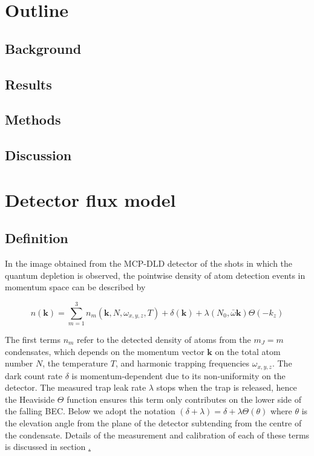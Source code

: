 \documentclass[%
 reprint,
 amsmath,amssymb,
 aps,
]{revtex4-1}
\begin{document}
\section{Outline}

\subsection{Background}

\subsection{Results}

\subsection{Methods}

\subsection{Discussion}


\section{\label{introduction}Detector flux model}
\subsection{Definition}
In the image obtained from the MCP-DLD detector of the shots in which the quantum depletion is observed, the pointwise density of atom detection events in momentum space can be described by

\begin{equation}
    n(\textbf{k}) = \sum_{m=1}^3 n_m(\textbf{k},N,\omega_{x,y,z},T) + \delta(\textbf{k}) + \lambda(N_0,\bar{\omega}\textbf{k})\Theta(-k_z)
\end{equation}

The first terms $n_m$ refer to the detected density of atoms from the $m_J=m$ condensates, which depends on the momentum vector $\textbf{k}$ on the total atom number $N$, the temperature $T$, and harmonic trapping frequencies $\omega_{x,y,z}$. 
The dark count rate $\delta$ is momentum-dependent due to its non-uniformity on the detector. 
The measured trap leak rate $\lambda$ stops when the trap is released, hence the Heaviside $\Theta$ function ensures this term 
only contributes on the lower side of the falling BEC. 
Below we adopt the notation $(\delta+\lambda) = \delta + \lambda\Theta(\theta)$ where $\theta$ is the elevation angle from the plane of the detector subtending from the centre of the condensate.
Details of the measurement and calibration of each of these terms is discussed in section \href{calibration}.
\end{document}
